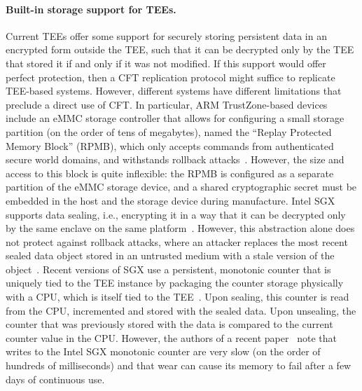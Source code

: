 \paragraph{Built-in storage support for TEEs.}
Current TEEs offer some support for securely storing persistent
data in an encrypted form outside the TEE, such that it can be
decrypted only by the TEE that stored it if and only if it was not
modified. If this support would offer perfect protection, then a
CFT replication protocol might suffice to replicate TEE-based
systems. However, different systems have different limitations
that preclude a direct use of CFT.  In particular, ARM
TrustZone-based devices include an eMMC storage controller that
allows for configuring a small storage partition (on the order of
tens of megabytes), named the ``Replay Protected Memory Block''
(RPMB), which only accepts commands from authenticated secure
world domains, and withstands rollback attacks~\cite{rpmb}.
However, the size and access to this block is quite inflexible:
the RPMB is configured as a separate partition of the eMMC
storage device, and a shared cryptographic secret must be
embedded in the host and the storage device during manufacture.
Intel SGX supports data sealing, i.e., encrypting it in a way
that it can be decrypted only by the same enclave on the same
platform~\cite{intelsgx}. However, this abstraction alone does
not protect against rollback attacks, where an attacker replaces
the most recent sealed data object stored in an untrusted medium
with a stale version of the object~\cite{memoir}. Recent versions
of SGX use a persistent, monotonic counter that is uniquely tied
to the TEE instance by packaging the counter storage physically
with a CPU, which is itself tied to the TEE~\cite{intelsgx}. Upon
sealing, this counter is read from the CPU, incremented and
stored with the sealed data. Upon unsealing, the counter that was
previously stored with the data is compared to the current
counter value in the CPU. However, the authors of a recent
paper~\cite{rote} note that writes to the Intel SGX monotonic
counter are very slow (on the order of hundreds of milliseconds)
and that wear can cause its memory to fail after a few days of
continuous use.

